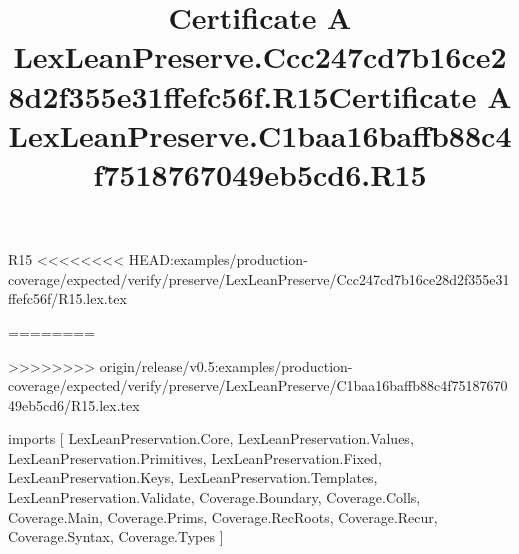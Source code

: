 \begin{lexlean}{R15}
<<<<<<<< HEAD:examples/production-coverage/expected/verify/preserve/LexLeanPreserve/Ccc247cd7b16ce28d2f355e31ffefc56f/R15.lex.tex
\title{Certificate A LexLeanPreserve.Ccc247cd7b16ce28d2f355e31ffefc56f.R15}
========
\title{Certificate A LexLeanPreserve.C1baa16baffb88c4f7518767049eb5cd6.R15}
>>>>>>>> origin/release/v0.5:examples/production-coverage/expected/verify/preserve/LexLeanPreserve/C1baa16baffb88c4f7518767049eb5cd6/R15.lex.tex
\begin{coremodule}
imports [
  LexLeanPreservation.Core,
  LexLeanPreservation.Values,
  LexLeanPreservation.Primitives,
  LexLeanPreservation.Fixed,
  LexLeanPreservation.Keys,
  LexLeanPreservation.Templates,
  LexLeanPreservation.Validate,
  Coverage.Boundary,
  Coverage.Colls,
  Coverage.Main,
  Coverage.Prims,
  Coverage.RecRoots,
  Coverage.Recur,
  Coverage.Syntax,
  Coverage.Types
]


\end{coremodule}
\end{lexlean}
